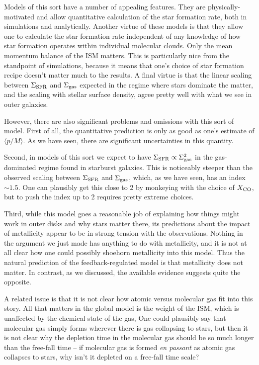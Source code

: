 Models of this sort have a number of appealing features. They are physically-motivated and allow quantitative calculation of the star formation rate, both in simulations and analytically. Another virtue of these models is that they allow one to calculate the star formation rate independent of any knowledge of how star formation operates within individual molecular clouds. Only the mean momentum balance of the ISM matters. This is particularly nice from the standpoint of simulations, because it means that one's choice of star formation recipe doesn't matter much to the results. A final virtue is that the linear scaling between $\Sigma_{\rm SFR}$ and $\Sigma_{\rm gas}$ expected in the regime where stars dominate the matter, and the scaling with stellar surface density, agree pretty well with what we see in outer galaxies.

However, there are also significant problems and omissions with this sort of model. First of all, the quantitative prediction is only as good as one's estimate of $\langle p/M\rangle$. As we have seen, there are significant uncertainties in this quantity.

Second, in models of this sort we expect to have $\Sigma_{\rm SFR} \propto \Sigma_{\rm gas}^2$ in the gas-dominated regime found in starburst galaxies. This is noticeably steeper than the observed scaling between $\Sigma_{\rm SFR}$ and $\Sigma_{\rm gas}$, which, as we have seen, has an index $\sim 1.5$. One can plausibly get this close to 2 by monkeying with the choice of $X_{\rm CO}$, but to push the index up to 2 requires pretty extreme choices.

Third, while this model goes a reasonable job of explaining how things might work in outer disks and why stars matter there, its predictions about the impact of metallicity appear to be in strong tension with the observations. Nothing in the argument we just made has anything to do with metallicity, and it is not at all clear how one could possibly shoehorn metallicity into this model. Thus the natural prediction of the feedback-regulated model is that metallicity does not matter. In contrast, as we discussed, the available evidence suggests quite the opposite.

A related issue is that it is not clear how atomic versus molecular gas fit into this story. All that matters in the global model is the weight of the ISM, which is unaffected by the chemical state of the gas, One could plausibly say that molecular gas simply forms wherever there is gas collapsing to stars, but then it is not clear why the depletion time in the molecular gas should be so much longer than the free-fall time -- if molecular gas is formed \textit{en passant} as atomic gas collapses to stars, why isn't it depleted on a free-fall time scale?

